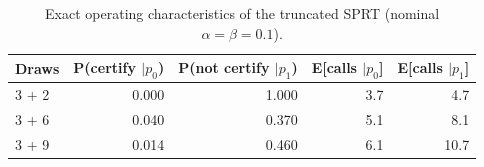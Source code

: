 \begin{table}[t]
\centering
\small
\begin{tabular}{lrrrr}
\toprule
Draws & P(certify $\mid p_0$) & P(not certify $\mid p_1$) & E[calls $\mid p_0$] & E[calls $\mid p_1$] \\
\midrule
3 + 2 & 0.000 & 1.000 & 3.7 & 4.7 \\
3 + 6 & 0.040 & 0.370 & 5.1 & 8.1 \\
3 + 9 & 0.014 & 0.460 & 6.1 & 10.7 \\
\bottomrule
\end{tabular}
\caption{Exact operating characteristics of the truncated SPRT (nominal $\alpha=\beta=0.1$).}
\label{tab:truncation}
\end{table}
